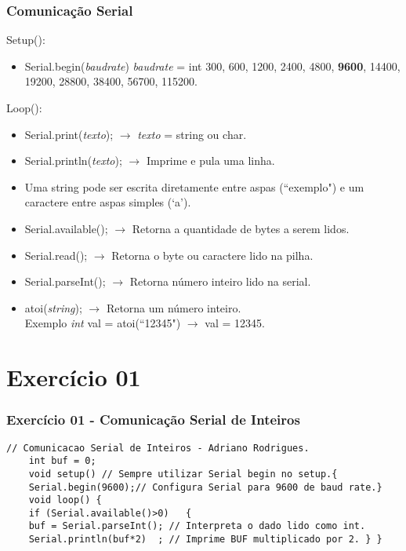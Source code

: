\documentclass{beamer}
\begin{document}
\begin{frame}[fragile]
	\frametitle{Comunicação Serial}
	Setup():
	\begin{itemize}
		\item Serial.begin(\textit{baudrate})
		\textit{baudrate} = int 300, 600, 1200, 2400, 4800, \textbf{9600}, 14400, 19200, 28800, 38400, 56700, 115200.
	\end{itemize}
	Loop():
	\begin{itemize}
		\item Serial.print(\textit{texto}); $\rightarrow$ \textit{texto} = string ou char.
		\item Serial.println(\textit{texto}); $\rightarrow$ Imprime e pula uma linha.
		\item Uma string pode ser escrita diretamente entre aspas (``exemplo") e um caractere entre aspas simples (`a').
		\item Serial.available();  $\rightarrow$ Retorna a quantidade de bytes a serem lidos.
		\item Serial.read(); $\rightarrow$ Retorna o byte ou caractere lido na pilha.
		\item Serial.parseInt(); $\rightarrow$ Retorna número inteiro lido na serial.
		\item atoi(\textit{string}); $\rightarrow$ Retorna um número inteiro.\\ Exemplo \textit{int} val = atoi(``12345") $\rightarrow$ val = 12345.
	\end{itemize}
\end{frame}

\section{Exercício 01}
\begin{frame}[fragile]
	\frametitle{Exercício 01 - Comunicação Serial de Inteiros}
	
	\begin{lstlisting}[style=Arduino]
	// Comunicacao Serial de Inteiros - Adriano Rodrigues.
	int buf = 0;
	void setup() // Sempre utilizar Serial begin no setup.{
	Serial.begin(9600);// Configura Serial para 9600 de baud rate.}
	void loop()	{
	if (Serial.available()>0)	{
	buf = Serial.parseInt(); // Interpreta o dado lido como int.
	Serial.println(buf*2)  ; // Imprime BUF multiplicado por 2. } } 	\end{lstlisting}
\end{frame}
\end{document}

